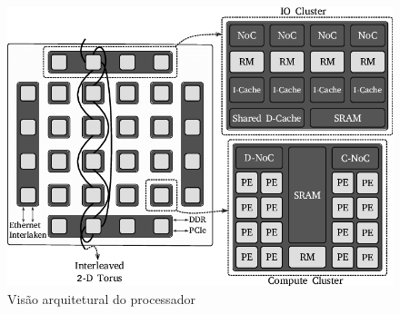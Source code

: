 \begin{figure}[bt]
    \centering
    \includegraphics[width=0.6\linewidth]{content/images/arch-mppa-gs.png}
    \caption{Visão arquitetural do processador \mppa \cite{penna:sbesc19}}\label{fig.arch-mppa}
\end{figure}

\section{\nanvixos}\label{sec.nanvixos}

